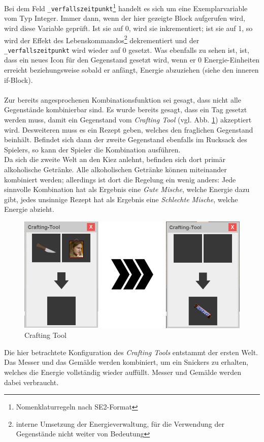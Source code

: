 \documentclass[12pt,twoside]{article}
\theoremstyle{plain}
\theoremstyle{definition}
\theoremstyle{remark}
\begin{document}
Bei dem Feld \texttt{\_verfallszeitpunkt}\footnote{Nomenklaturregeln nach SE2-Format} handelt es sich um eine Exemplarvariable vom Typ Integer.
Immer dann, wenn der hier gezeigte Block aufgerufen wird, wird diese Variable geprüft.
Ist sie auf 0, wird sie inkrementiert; ist sie auf 1, so wird der Effekt des Lebenskommandos\footnote{interne Umsetzung der Energieverwaltung, für die Verwendung der Gegenstände nicht weiter von Bedeutung} dekrementiert und der \texttt{\_verfallszeitpunkt} wird wieder auf 0 gesetzt.
Was ebenfalls zu sehen ist, ist, dass ein neues Icon für den Gegenstand gesetzt wird, wenn er 0 Energie-Einheiten erreicht beziehungsweise sobald er anfängt, Energie abzuziehen (siehe den inneren if-Block).\\
\\
Zur bereits angesprochenen Kombinationsfunktion sei gesagt, dass nicht alle Gegenstände kombinierbar sind.
Es wurde bereits gesagt, dass ein Tag gesetzt werden muss, damit ein Gegenstand vom \textit{Crafting Tool} (vgl. Abb. \ref{fig:main_craft}) akzeptiert wird.
Desweiteren muss es ein Rezept geben, welches den fraglichen Gegenstand beinhält.
Befindet sich dann der zweite Gegenstand ebenfalls im Rucksack des Spielers, so kann der Spieler die Kombination ausführen.\\
Da sich die zweite Welt an den Kiez anlehnt, befinden sich dort primär alkoholische Getränke.
Alle alkoholischen Getränke können miteinander kombiniert werden; allerdings ist dort die Regelung ein wenig anders: Jede sinnvolle Kombination hat als Ergebnis eine \textit{Gute Mische}, welche Energie dazu gibt, jedes unsinnige Rezept hat als Ergebnis eine \textit{Schlechte Mische}, welche Energie abzieht.
\begin{figure}[h!bt]
    \begin{center}
        \includegraphics[scale=0.5]{craftingUI.png}
    	\caption{Crafting Tool}
        \label{fig:main_craft}
    \end{center}
\end{figure}
Die hier betrachtete Konfiguration des \textit{Crafting Tools} entstammt der ersten Welt.
Das Messer und das Gemälde werden kombiniert, um ein Snickers zu erhalten, welches die Energie vollständig wieder auffüllt.
Messer und Gemälde werden dabei verbraucht.
\end{document}
